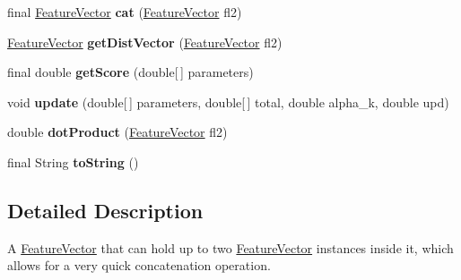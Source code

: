 \begin{DoxyCompactItemize}
\item 
\hypertarget{classmstparser_1_1FeatureVector_ae4ba90ff3fd31a66e94a9f4cb61c778d}{
final \hyperlink{classmstparser_1_1FeatureVector}{FeatureVector} {\bfseries cat} (\hyperlink{classmstparser_1_1FeatureVector}{FeatureVector} fl2)}
\label{classmstparser_1_1FeatureVector_ae4ba90ff3fd31a66e94a9f4cb61c778d}

\item 
\hypertarget{classmstparser_1_1FeatureVector_ad2a9996b7ab69b766fc3c6ef1de4dff7}{
\hyperlink{classmstparser_1_1FeatureVector}{FeatureVector} {\bfseries getDistVector} (\hyperlink{classmstparser_1_1FeatureVector}{FeatureVector} fl2)}
\label{classmstparser_1_1FeatureVector_ad2a9996b7ab69b766fc3c6ef1de4dff7}

\item 
\hypertarget{classmstparser_1_1FeatureVector_aa9f4847f097dcc0f105843a1b325f6cd}{
final double {\bfseries getScore} (double\mbox{[}$\,$\mbox{]} parameters)}
\label{classmstparser_1_1FeatureVector_aa9f4847f097dcc0f105843a1b325f6cd}

\item 
\hypertarget{classmstparser_1_1FeatureVector_afb4d05854299aa65b3a84a6e7bf708ce}{
void {\bfseries update} (double\mbox{[}$\,$\mbox{]} parameters, double\mbox{[}$\,$\mbox{]} total, double alpha\_\-k, double upd)}
\label{classmstparser_1_1FeatureVector_afb4d05854299aa65b3a84a6e7bf708ce}

\item 
\hypertarget{classmstparser_1_1FeatureVector_a7268e01fbf66adce9c50488bc5432319}{
double {\bfseries dotProduct} (\hyperlink{classmstparser_1_1FeatureVector}{FeatureVector} fl2)}
\label{classmstparser_1_1FeatureVector_a7268e01fbf66adce9c50488bc5432319}

\item 
\hypertarget{classmstparser_1_1FeatureVector_aa76e9ef8e2a415d3ec62dc6d75d847e1}{
final String {\bfseries toString} ()}
\label{classmstparser_1_1FeatureVector_aa76e9ef8e2a415d3ec62dc6d75d847e1}

\end{DoxyCompactItemize}


\subsection{Detailed Description}
A {\ttfamily \hyperlink{classmstparser_1_1FeatureVector}{FeatureVector}} that can hold up to two {\ttfamily \hyperlink{classmstparser_1_1FeatureVector}{FeatureVector}} instances inside it, which allows for a very quick concatenation operation.


